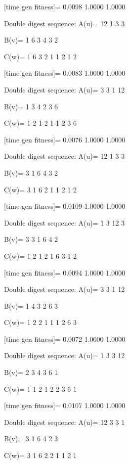[time gen fitness]=
    0.0098    1.0000    1.0000

Double digest sequence:
A(u)=
    12     1     3     3

B(v)=
     1     6     3     4     3     2

C(w)=
     1     6     3     2     1     1     2     1     2

[time gen fitness]=
    0.0083    1.0000    1.0000

Double digest sequence:
A(u)=
     3     3     1    12

B(v)=
     1     3     4     2     3     6

C(w)=
     1     2     1     2     1     1     2     3     6

[time gen fitness]=
    0.0076    1.0000    1.0000

Double digest sequence:
A(u)=
    12     1     3     3

B(v)=
     3     1     6     4     3     2

C(w)=
     3     1     6     2     1     1     2     1     2

[time gen fitness]=
    0.0109    1.0000    1.0000

Double digest sequence:
A(u)=
     1     3    12     3

B(v)=
     3     3     1     6     4     2

C(w)=
     1     2     1     2     1     6     3     1     2

[time gen fitness]=
    0.0094    1.0000    1.0000

Double digest sequence:
A(u)=
     3     3     1    12

B(v)=
     1     4     3     2     6     3

C(w)=
     1     2     2     1     1     1     2     6     3

[time gen fitness]=
    0.0072    1.0000    1.0000

Double digest sequence:
A(u)=
     1     3     3    12

B(v)=
     2     3     4     3     6     1

C(w)=
     1     1     2     1     2     2     3     6     1

[time gen fitness]=
    0.0107    1.0000    1.0000

Double digest sequence:
A(u)=
    12     3     3     1

B(v)=
     3     1     6     4     2     3

C(w)=
     3     1     6     2     2     1     1     2     1

